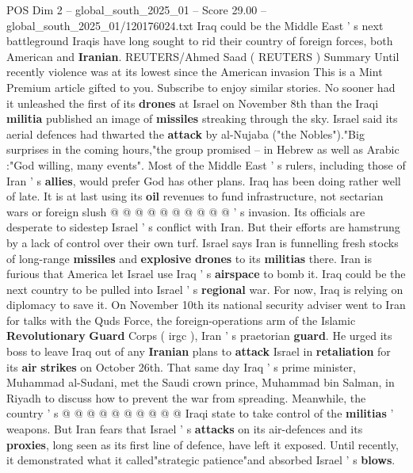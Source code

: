 \begin{textsample}{POS Dim 2 – global\_south\_2025\_01 – Score 29.00 – global\_south\_2025\_01/120176024.txt}  \label{ex:f2_pos_321}
Iraq could be the Middle East ' s next battleground Iraqis have long sought to rid their country of foreign forces, both American and \textbf{Iranian}.
REUTERS/Ahmed Saad ( REUTERS ) Summary Until recently violence was at its lowest since the American invasion This is a Mint Premium article gifted to you.
Subscribe to enjoy similar stories.
No sooner had it unleashed the first of its \textbf{drones} at Israel on November 8th than the Iraqi \textbf{militia} published an image of \textbf{missiles} streaking through the sky.
Israel said its aerial defences had thwarted the \textbf{attack} by al-Nujaba ("the Nobles")."Big surprises in the coming hours,"the group promised -- in Hebrew as well as Arabic :"God willing, many events".
Most of the Middle East ' s rulers, including those of Iran ' s \textbf{allies}, would prefer God has other plans.
Iraq has been doing rather well of late.
It is at last using its \textbf{oil} revenues to fund infrastructure, not sectarian wars or foreign slush @ @ @ @ @ @ @ @ @ @ ' s invasion.
Its officials are desperate to sidestep Israel ' s conflict with Iran.
But their efforts are hamstrung by a lack of control over their own turf.
Israel says Iran is funnelling fresh stocks of long-range \textbf{missiles} and \textbf{explosive} \textbf{drones} to its \textbf{militias} there.
Iran is furious that America let Israel use Iraq ' s \textbf{airspace} to bomb it.
Iraq could be the next country to be pulled into Israel ' s \textbf{regional} war.
For now, Iraq is relying on diplomacy to save it.
On November 10th its national security adviser went to Iran for talks with the Quds Force, the foreign-operations arm of the Islamic \textbf{Revolutionary} \textbf{Guard} Corps ( irgc ), Iran ' s praetorian \textbf{guard}.
He urged its boss to leave Iraq out of any \textbf{Iranian} plans to \textbf{attack} Israel in \textbf{retaliation} for its \textbf{air} \textbf{strikes} on October 26th.
That same day Iraq ' s prime minister, Muhammad al-Sudani, met the Saudi crown prince, Muhammad bin Salman, in Riyadh to discuss how to prevent the war from spreading.
Meanwhile, the country ' s @ @ @ @ @ @ @ @ @ @ Iraqi state to take control of the \textbf{militias} ' weapons.
But Iran fears that Israel ' s \textbf{attacks} on its air-defences and its \textbf{proxies}, long seen as its first line of defence, have left it exposed.
Until recently, it demonstrated what it called"strategic patience"and absorbed Israel ' s \textbf{blows}.

\end{textsample}
